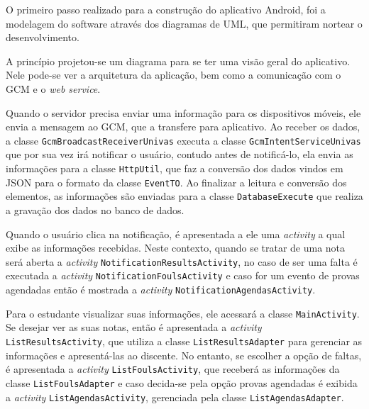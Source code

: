 
	\par O primeiro passo realizado para a construção do aplicativo Android, foi a
modelagem do software através dos diagramas de UML, que permitiram nortear o
desenvolvimento.

	\par A princípio projetou-se um diagrama para se ter uma visão geral do
aplicativo. Nele pode-se ver a arquitetura da aplicação, bem como a comunicação
com o GCM e o \textit{web service}.

	\par Quando o servidor precisa enviar uma informação para os dispositivos
móveis, ele envia a mensagem ao GCM, que a transfere para aplicativo. Ao
receber os dados, a classe \texttt{GcmBroadcastReceiverUnivas} executa a classe
\texttt{GcmIntentServiceUnivas} que por sua vez irá notificar o usuário,
contudo antes de notificá-lo, ela envia as informações para a classe
\texttt{HttpUtil}, que faz a conversão dos dados vindos em JSON para o formato
da classe \texttt{EventTO}. Ao finalizar a leitura e conversão dos elementos,
as informações são enviadas para a classe \texttt{DatabaseExecute} que realiza
a gravação dos dados no banco de dados.

	\par Quando o usuário clica na notificação, é apresentada a ele uma
\textit{activity} a qual exibe as informações recebidas. Neste contexto, quando
se tratar de uma nota será aberta a \textit{activity}
\texttt{NotificationResultsActivity}, no caso de ser uma falta é executada a
\textit{activity} \texttt{NotificationFoulsActivity} e caso for um evento de
provas agendadas então é mostrada a \textit{activity}
\texttt{NotificationAgendasActivity}.

	\par Para o estudante visualizar suas informações, ele acessará a classe
\texttt{MainActivity}. Se desejar ver as suas notas, então é apresentada a
\textit{activity} \texttt{ListResultsActivity}, que utiliza a classe
\texttt{ListResultsAdapter} para gerenciar as informações e apresentá-las ao
discente. No entanto, se escolher a opção de faltas, é apresentada a
\textit{activity} \texttt{ListFoulsActivity}, que receberá as informações da
classe \texttt{ListFoulsAdapter} e caso decida-se pela opção provas agendadas é
exibida a \textit{activity} \texttt{ListAgendasActivity}, gerenciada pela
classe \texttt{ListAgendasAdapter}.

